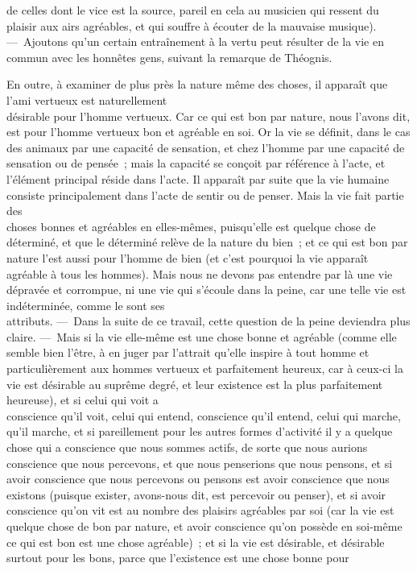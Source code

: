 \documentclass[french,twoside]{book} %
\begin{document}
de celles dont le vice est la source, pareil en cela au musicien qui ressent du plaisir aux airs agréables, et qui souffre à écouter de la mauvaise musique). — Ajoutons qu’un certain entraînement à la vertu peut résulter de la vie en commun avec les honnêtes gens, suivant la remarque de Théognis.\par
En outre, à examiner de plus près la nature même des choses, il apparaît que l’ami vertueux est naturellement \\
désirable pour l’homme vertueux. Car ce qui est bon par nature, nous l’avons dit, est pour l’homme vertueux bon et agréable en soi. Or la vie se définit, dans le cas des animaux par une capacité de sensation, et chez l’homme par une capacité de sensation ou de pensée ; mais la capacité se conçoit par référence à l’acte, et l’élément principal réside dans l’acte. Il apparaît par suite que la vie humaine consiste principalement dans l’acte de sentir ou de penser. Mais la vie fait partie des \\
choses bonnes et agréables en elles-mêmes, puisqu’elle est quelque chose de déterminé, et que le déterminé relève de la nature du bien ; et ce qui est bon par nature l’est aussi pour l’homme de bien (et c’est pourquoi la vie apparaît agréable à tous les hommes). Mais nous ne devons pas entendre par là une vie dépravée et corrompue, ni une vie qui s’écoule dans la peine, car une telle vie est indéterminée, comme le sont ses \\
attributs. — Dans la suite de ce travail, cette question de la peine deviendra plus claire. — Mais si la vie elle-même est une chose bonne et agréable (comme elle semble bien l’être, à en juger par l’attrait qu’elle inspire à tout homme et particulièrement aux hommes vertueux et parfaitement heureux, car à ceux-ci la vie est désirable au suprême degré, et leur existence est la plus parfaitement heureuse), et si celui qui voit a \\
conscience qu’il voit, celui qui entend, conscience qu’il entend, celui qui marche, qu’il marche, et si pareillement pour les autres formes d’activité il y a quelque chose qui a conscience que nous sommes actifs, de sorte que nous aurions conscience que nous percevons, et que nous penserions que nous pensons, et si avoir conscience que nous percevons ou pensons est avoir conscience que nous existons (puisque  exister, avons-nous dit, est percevoir ou penser), et si avoir conscience qu’on vit est au nombre des plaisirs agréables par soi (car la vie est quelque chose de bon par nature, et avoir conscience qu’on possède en soi-même ce qui est bon est une chose agréable) ; et si la vie est désirable, et désirable surtout pour les bons, parce que l’existence est une chose bonne pour \\
\end{document}
